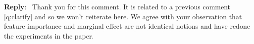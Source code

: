 \documentclass[11pt]{article}
\newcounter{se}[section]
\newcounter{reviewer}
\newenvironment{reply}
 {\par\medskip \noindent \begin{sf}\textbf{Reply}:\ }
 {\medskip \end{sf}}
\begin{document}
\begin{reply}
Thank you for this comment. It is related to a previous comment \ref{q:clarify} and \label{r1:research_question} so we won't reiterate here. We agree with your observation that feature importance and marginal effect are not identical notions and have redone the experiments in the paper.




\end{reply}


\end{document}
